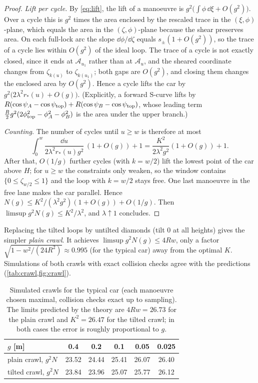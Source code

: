 \begin{proof}
\emph{Lift per cycle.}
By \eqref{eq:lift}, the lift of a manoeuvre is $g^2\big(\int\phi\,\dd\xi+O(g^2)\big)$.
Over a cycle this is $g^2$ times the area enclosed by the rescaled trace in the $(\xi,\phi)$-plane, which equals the area in the $(\zeta,\phi)$-plane because the shear preserves area.
On each full-lock arc the slope $\dd\phi/\dd\zeta$ equals $s_\pm(1+O(g^2))$, so the trace of a cycle lies within $O(g^2)$ of the ideal loop.
The trace of a cycle is not exactly closed, since it ends at $\mathcal A_{u_1}$ rather than at $\mathcal A_u$, and the sheared coordinate changes from $\zeta_{k(u)}$ to $\zeta_{k(u_1)}$; both gaps are $O(g^2)$, and closing them changes the enclosed area by $O(g^2)$.
Hence a cycle lifts the car by $g^2\big(2\lambda^2r_*(u)+O(g)\big)$.
(Explicitly, a forward S-curve lifts by $R(\cos\psi_A-\cos\psi_{\rm top})+R(\cos\psi_B-\cos\psi_{\rm top})$, whose leading term $\frac R2g^2(2\phi_{\rm top}^2-\phi_A^2-\phi_B^2)$ is the area under the upper branch.)

\emph{Counting.}
The number of cycles until $u\ge w$ is therefore at most
\[
  \int_0^w\frac{\dd u}{2\lambda^2r_*(u)g^2}\,(1+O(g))+1=\frac{K^2}{2\lambda^2g^2}(1+O(g))+1 .
\]
After that, $O(1/g)$ further cycles (with $k=w/2$) lift the lowest point of the car above $H$; for $u\ge w$ the constraints only weaken, so the window contains $\{0\le\zeta_{w/2}\le1\}$ and the loop with $k=w/2$ stays free.
One last manoeuvre in the free lane makes the car parallel.
Hence $N(g)\le K^2/(\lambda^2g^2)(1+O(g))+O(1/g)$.
Then $\limsup g^2N(g)\le K^2/\lambda^2$, and $\lambda\uparrow1$ concludes.
\end{proof}

\begin{remark}
Replacing the tilted loops by untilted diamonds (tilt $0$ at all heights) gives the simpler \emph{plain crawl}.
It achieves $\limsup g^2N(g)\le4Rw$, only a factor $\sqrt{1-w^2/(24R^2)}\approx0.995$ (for the typical car) away from the optimal $K$.
Simulations of both crawls with exact collision checks agree with the predictions (\cref{tab:crawl,fig:crawl}).
\end{remark}

\begin{table}[ht]
\centering
\begin{tabular}{lccccc}
\toprule
$g$ [m] & 0.4 & 0.2 & 0.1 & 0.05 & 0.025\\
\midrule
plain crawl, $g^2N$ & 23.52 & 24.44 & 25.41 & 26.07 & 26.40\\
tilted crawl, $g^2N$ & 23.84 & 23.96 & 25.07 & 25.77 & 26.12\\
\bottomrule
\end{tabular}
\caption{Simulated crawls for the typical car (each manoeuvre chosen maximal, collision checks exact up to sampling).
The limits predicted by the theory are $4Rw=26.73$ for the plain crawl and $K^2=26.47$ for the tilted crawl; in both cases the error is roughly proportional to $g$.}
\label{tab:crawl}
\end{table}

